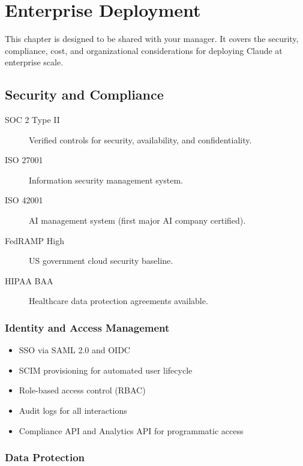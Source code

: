 \chapter{Enterprise Deployment}
\label{ch:enterprise}

This chapter is designed to be shared with your manager.
It covers the security, compliance, cost, and organizational considerations
for deploying Claude at enterprise scale.

\section{Security and Compliance}
\label{sec:security}



\begin{description}
  \item[SOC 2 Type II] Verified controls for security, availability, and confidentiality.
  \item[ISO 27001] Information security management system.
  \item[ISO 42001] AI management system (first major AI company certified).
  \item[FedRAMP High] US government cloud security baseline.
  \item[HIPAA BAA] Healthcare data protection agreements available.
\end{description}

\subsection{Identity and Access Management}

\begin{itemize}
  \item SSO via SAML 2.0 and OIDC
  \item SCIM provisioning for automated user lifecycle
  \item Role-based access control (RBAC)
  \item Audit logs for all interactions
  \item Compliance API and Analytics API for programmatic access
\end{itemize}

\subsection{Data Protection}

